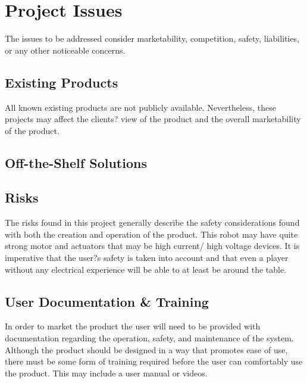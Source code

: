 \documentclass[titlepage]{article}
\begin{document}
\section{Project Issues}
The issues to be addressed consider marketability, competition, safety, liabilities, or any other noticeable
concerns.
\subsection{Existing Products}
All known existing products are not publicly available. Nevertheless, these projects may affect the clients? view of the product and the overall marketability of the product.

\subsection{Off-the-Shelf Solutions}

\subsection{Risks}
The risks found in this project generally describe the safety considerations found with both the creation and operation of the product. This robot may have quite strong motor and actuators that may be high current/ high voltage devices. It is imperative that the user?s safety is taken into account and that even a player without any electrical experience will be able to at least be around the table.

\subsection{User Documentation \& Training}
In order to market the product the user will need to be provided with documentation regarding the operation, safety, and maintenance of the system. Although the product should be designed in a way that promotes ease of use, there must be some form of training required before the user can comfortably use the product. This may include a user manual or videos.




\pagebreak
\printindex
\end{document}

